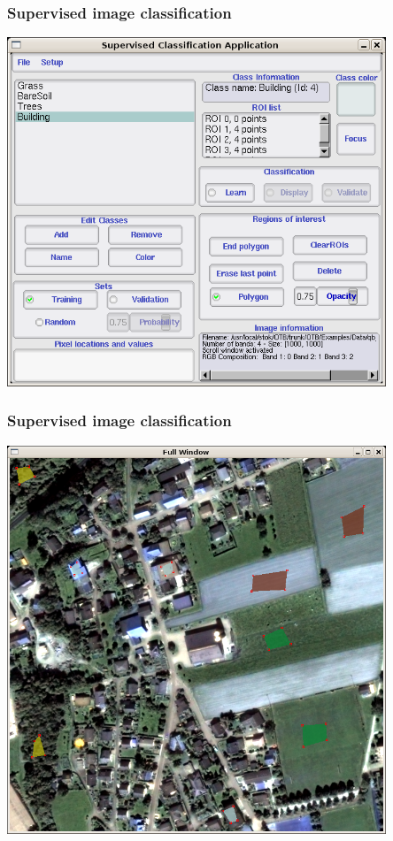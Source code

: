 \documentclass[compress]{beamer}
\begin{document}
\begin{frame}
  \frametitle{Supervised image classification}
      \begin{center}
      \includegraphics[width=0.85\textwidth]{Images/classifGUI.png}
  \end{center}
\end{frame}

\begin{frame}
  \frametitle{Supervised image classification}
      \begin{center}
      \includegraphics[width=0.85\textwidth]{Images/classfTrain.png}
  \end{center}
\end{frame}
\end{document}

